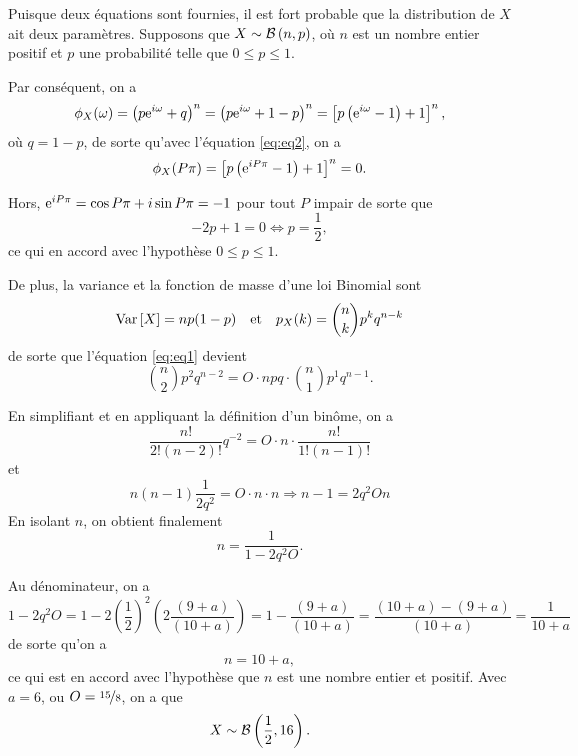 \documentclass[11pt]{article}
\newcommand\Var[1]{%
	\ensuremath{%
		\mathrm{Var}\left[#1\right]%
	}%
}%
\newcommand\Bin[2]{%
	\ensuremath{%
		\mathcal{B}\left(#1,#2\right)%
	}%
}%
\newcommand\e{%
    \ensuremath{%
        \mathrm{e}%
    }%
}
\begin{document}
Puisque deux équations sont fournies, il est fort probable que la distribution
de $X$ ait deux paramètres. Supposons que $X\sim\Bin{n}{p}$, où $n$ est un
nombre entier positif et $p$ une probabilité telle que $0\leq p\leq 1$.

Par conséquent, on a
\begin{equation*}
    \phi_X(\omega)
    =\left(p\e^{i\omega}+q\right)^n
    =\left(p\e^{i\omega}+1-p\right)^n
    =\left[p\left(\e^{i\omega}-1\right)+1\right]^n,
\end{equation*}
où $q=1-p$, de sorte qu'avec l'équation \eqref{eq:eq2}, on a
\begin{equation*}
    \phi_X(P\pi)
    =\left[p\left(\e^{iP\pi}-1\right)+1\right]^n
    =0.
\end{equation*}

Hors, $\e^{iP\pi}=\cos{P\pi}+i\sin{P\pi}=-1$ pour tout $P$ impair de sorte que
\begin{equation*}
    -2p+1=0\Leftrightarrow
    p=\frac{1}{2},
\end{equation*}
ce qui en accord avec l'hypothèse $0\leq p\leq 1$.

De plus, la variance et la fonction de masse d'une loi Binomial sont
\begin{equation*}
    \Var{X}=np(1-p)\quad\text{et}\quad
    p_X(k)=\binom{n}{k}p^kq^{n-k}
\end{equation*}
de sorte que l'équation \eqref{eq:eq1} devient
\begin{equation*}
    \binom{n}{2}p^2q^{n-2}
    =O\cdot npq\cdot \binom{n}{1}p^1q^{n-1}.
\end{equation*}

En simplifiant et en appliquant la définition d'un binôme, on a
\begin{equation*}
    \frac{n!}{2!(n-2)!}q^{-2}
    =O\cdot n\cdot\frac{n!}{1!(n-1)!}
\end{equation*}
et
\begin{equation*}
    n(n-1)\frac{1}{2q^2}=O\cdot n\cdot n
    \Rightarrow
    n-1=2q^2On
\end{equation*}
En isolant $n$, on obtient finalement
\begin{equation*}
    n
    =\frac{1}{1-2q^2O}.
\end{equation*}

Au dénominateur, on a
\begin{equation*}
    1-2q^2O
    =1-2\left(\frac{1}{2}\right)^2\left(2\frac{(9+a)}{(10+a)}\right)
    =1-\frac{(9+a)}{(10+a)}
    =\frac{(10+a)-(9+a)}{(10+a)}
    =\frac{1}{10+a}
\end{equation*}
de sorte qu'on a
\begin{equation*}
    n=10+a,
\end{equation*}
ce qui est en accord avec l'hypothèse que $n$ est une nombre entier
et positif. Avec $a=6$, ou $O=\nicefrac{15}{8}$, on a que
\begin{equation*}
    X\sim\Bin{\frac{1}{2}}{16}.
\end{equation*}
\end{document}
